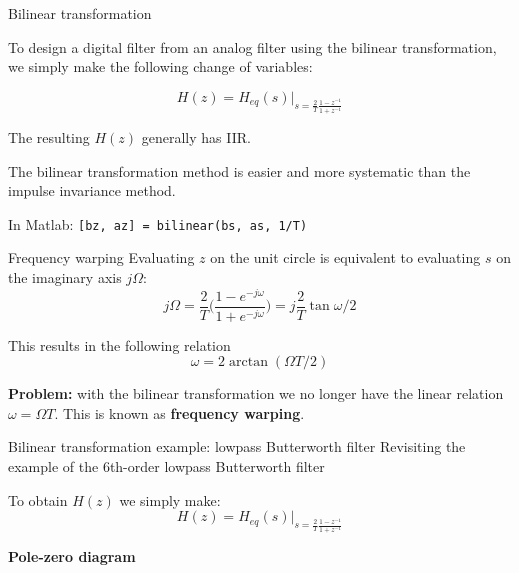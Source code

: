 \documentclass[10pt, handout]{beamer}
\begin{document}
\begin{frame}{Bilinear transformation}

To design a digital filter from an analog filter using the bilinear transformation, we simply make the following change of variables:

\begin{equation*}
H(z) = H_{eq}(s)\bigg|_{\displaystyle s = \frac{2}{T}\frac{1 - z^{-1}}{1 + z^{-1}}}
\end{equation*}

The resulting $H(z)$ generally has IIR.
\vspace{0.25cm}

The bilinear transformation method is easier and more systematic than the impulse invariance method.
\vspace{0.25cm}

In Matlab: \texttt{[bz, az] = bilinear(bs, as, 1/T)}

\end{frame}

\begin{frame}{Frequency warping}
	Evaluating $z$ on the unit circle is equivalent to evaluating $s$ on the imaginary axis $j\Omega$:
	\begin{equation*}
j\Omega = \frac{2}{T}\bigg(\frac{1 - e^{-j\omega}}{1 + e^{-j\omega}}\bigg) = j\frac{2}{T}\tan\omega/2
\end{equation*}

This results in the following relation
\begin{equation*}
	\omega =2\arctan(\Omega T/2) \tag{frequency warping}
\end{equation*}

\textbf{Problem:} with the bilinear transformation we no longer have the linear relation $\omega = \Omega T$. This is known as \textbf{frequency warping}.

\begin{center}
	\resizebox{0.5\linewidth}{!}{}
\end{center}
\end{frame}

%
\begin{frame}{Bilinear transformation example: lowpass Butterworth filter}
Revisiting the example of the 6th-order lowpass Butterworth filter

To obtain $H(z)$ we simply make:
\begin{equation*}
H(z) = H_{eq}(s)\bigg|_{\displaystyle s = \frac{2}{T}\frac{1 - z^{-1}}{1 + z^{-1}}}
\end{equation*}

\textbf{Pole-zero diagram}
\begin{center}
	\resizebox{0.6\linewidth}{!}{}
\end{center}

\end{frame}
\end{document}
